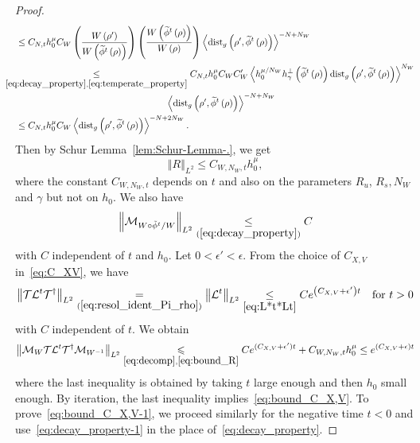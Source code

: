 \documentclass[AHL,Unicode,longabstracts,published]{cedram}
\newcommand*\eq[1]{\underset{(#1)}{=}}
\newcommand*\ineq[1]{\underset{(#1)}{\leq}}
\newcommand{\clT}{\mathcal{T}}
\newcommand{\clL}{\mathcal{L}}
\newcommand{\clM}{\mathcal{M}}
\newcommand{\dist}{\mathrm{dist}}
\let\oldtilde\tilde
\renewcommand*{\tilde}[1]{\mathchoice{\widetilde{#1}}{\widetilde{#1}}{\oldtilde{#1}}{\oldtilde{#1}}}
\begin{document}
\begin{proof}
\begin{align}
&\leq  C_{N,t}h_{0}^{\mu}C_{W}\left(\frac{W\left(\rho'\right)}{W\left(\tilde{\phi}^{t}\left(\rho\right)\right)}\right)\left(\frac{W\left(\tilde{\phi}^{t}\left(\rho\right)\right)}{W\left(\rho\right)}\right)\left\langle \dist_{g}\left(\rho',\tilde{\phi}^{t}\left(\rho\right)\right)\right\rangle ^{-N+N_{W}}\nonumber\\
&\mkern-25mu\underset{\eqref{eq:decay_property},\eqref{eq:temperate_property}}{\leq}  C_{N,t}h_{0}^{\mu}C_{W}C'_{W}\left\langle h_{0}^{\mu/N_{W}}h_{\gamma}^{\perp}\left(\tilde{\phi}^{t}\left(\rho\right)\right)\dist_{g}\left(\rho',\tilde{\phi}^{t}\left(\rho\right)\right)\right\rangle ^{N_{W}}\nonumber\\
&\mkern293mu\left\langle \dist_{g}\left(\rho',\tilde{\phi}^{t}\left(\rho\right)\right)\right\rangle ^{-N+N_{W}}
\nonumber\\
&\leq  C_{N,t}h_{0}^{\mu}C_{W}\left\langle \dist_{g}\left(\rho',\tilde{\phi}^{t}\left(\rho\right)\right)\right\rangle ^{-N+2N_{W}}\nonumber.\label{eq:res_int}
\end{align}
Then by Schur Lemma~\ref{lem:Schur-Lemma-.}, we get
\begin{equation}\label{eq:bound_R}
\left\Vert R\right\Vert _{L^{2}}\le C_{W,N_{W},t}h_{0}^{\mu},
\end{equation}
where the constant $C_{W,N_{W},t}$ depends on $t$ and also on the parameters $R_{u}$, $R_{s},N_{W}$ and $\gamma$ but not on $h_{0}$. We also have
\[
\left\Vert \clM_{W\circ\tilde{\phi}^{t}/W}\right\Vert _{L^{2}}\ineq{\ref{eq:decay_property}}C
\]
with $C$ independent of $t$ and $h_{0}$. Let $0<\epsilon'<\epsilon$. From the choice of $C_{X,V}$ in~\eqref{eq:C_XV}, we have
\[
\left\Vert \ensuremath{\clT}\ensuremath{\clL^{t}}\ensuremath{\clT^{\dagger}}\right\Vert _{L^{2}}\eq{\ref{eq:resol_ident_Pi_rho}}\ensuremath{\left\Vert \clL^{t}\right\Vert _{L^{2}}}\underset{\eqref{eq:L*t*Lt}}{\leq}Ce^{\left(C_{X,V}+\epsilon'\right)t}\quad\text{for }t>0
\]
with $C$ independent of $t$. We obtain
\[
\left\Vert \clM_{W}\text{\ensuremath{\clT}\ensuremath{\clL^{t}}\ensuremath{\clT^{\dagger}}}\clM_{W^{-1}}\right\Vert _{L^{2}}\underset{\eqref{eq:decomp},\eqref{eq:bound_R}}{\leqslant}Ce^{(C_{X,V}+\epsilon')t}+C_{W,N_{W},t}h_{0}^{\mu}\le e^{(C_{X,V}+\epsilon)t}
\]
where the last inequality is obtained by taking $t$ large enough and then $h_{0}$ small enough. By iteration, the last inequality implies~\eqref{eq:bound_C_X,V}. To prove~\eqref{eq:bound_C_X,V-1}, we proceed similarly for the negative time $t<0$ and use~\eqref{eq:decay_property-1} in the place of~\eqref{eq:decay_property}.
\end{proof}
\end{document}
